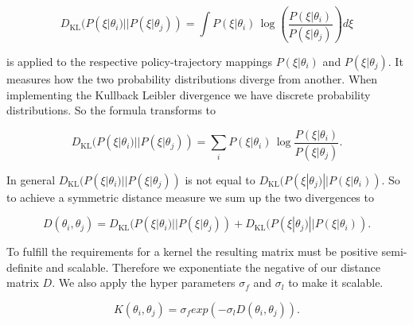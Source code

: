 $$D_{\mathrm {KL} }(P(\xi|\theta_{ i })||P(\xi|\theta_{ j })) = \int{ P(\xi|\theta_{ i })\,\log\left(\frac{ P(\xi|\theta_{ i }) }{ P(\xi|\theta_{ j }) }\right)d\xi }$$

is applied to the respective policy-trajectory mappings $P(\xi|\theta_{ i })$ and $P(\xi|\theta_{ j })$. It measures how the two probability distributions diverge from another. When implementing the Kullback Leibler divergence we have discrete probability distributions. So the formula transforms to

$$D_{\mathrm {KL} }(P(\xi|\theta_{ i })||P(\xi|\theta_{ j })) = \sum _{i}P(\xi|\theta_{ i })\,\log {\frac {P(\xi|\theta_{ i })}{P(\xi|\theta_{ j })}}.$$

In general $D_{\mathrm {KL} }(P(\xi|\theta_{ i })||P(\xi|\theta_{ j }))$ is not equal to $D_{\mathrm {KL} }(P(\xi|\theta_{ j })||P(\xi|\theta_{ i }))$. So to achieve a symmetric distance measure we sum up the two divergences to

$$D(\theta_{ i }, \theta_{ j }) = D_{\mathrm {KL} }(P(\xi|\theta_{ i })||P(\xi|\theta_{ j })) + D_{\mathrm {KL} }(P(\xi|\theta_{ j })||P(\xi|\theta_{ i })).$$

To fulfill the requirements for a kernel the resulting matrix must be positive semi-definite and scalable. Therefore we exponentiate the negative of our distance matrix $D$. We also apply the hyper parameters $\sigma_f$ and $\sigma_l$ to make it scalable.

$$K(\theta_{ i },\theta_{ j }) = \sigma_f exp(-\sigma_l D(\theta_{ i }, \theta_{ j })).$$
